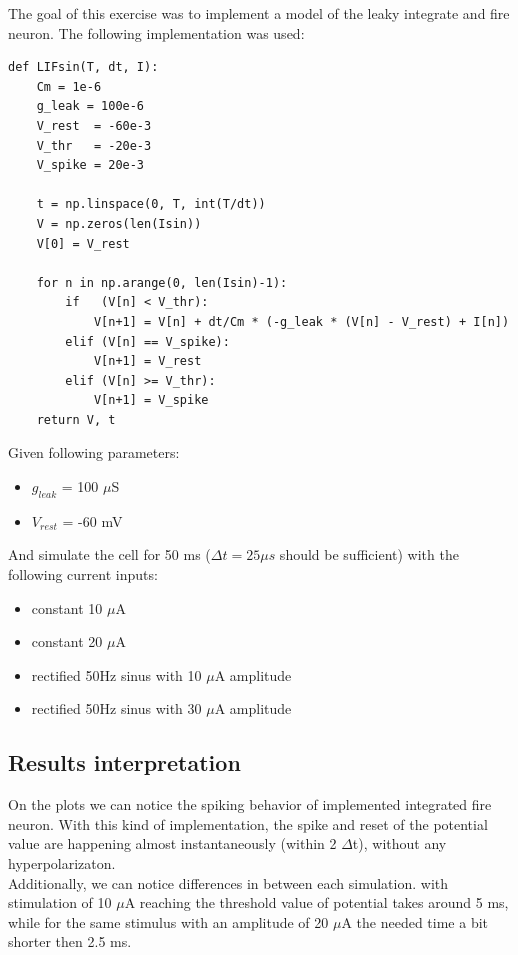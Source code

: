 \documentclass{scrartcl}			%
\begin{document}
The goal of this exercise was to implement a model of the leaky integrate and fire neuron. The following implementation was used:

\begin{Verbatim}[tabsize=4]
def LIFsin(T, dt, I):
	Cm = 1e-6
	g_leak = 100e-6
	V_rest  = -60e-3
	V_thr   = -20e-3
	V_spike = 20e-3

	t = np.linspace(0, T, int(T/dt))
	V = np.zeros(len(Isin))
	V[0] = V_rest

	for n in np.arange(0, len(Isin)-1):
		if   (V[n] < V_thr):
			V[n+1] = V[n] + dt/Cm * (-g_leak * (V[n] - V_rest) + I[n])
		elif (V[n] == V_spike):
			V[n+1] = V_rest
		elif (V[n] >= V_thr):
			V[n+1] = V_spike
	return V, t
\end{Verbatim}

Given following parameters:
\begin{itemize}
	\item $g_{leak}$ = 100 $\mu$S
	\item $V_{rest}$ = -60 mV
\end{itemize}

And simulate the cell for 50 ms ($\Delta t = 25 \mu s$ should be sufficient) with the following
current inputs:
\begin{itemize}
	\item constant 10 $\mu$A
	\item constant 20 $\mu$A
	\item rectified 50Hz sinus with 10 $\mu$A amplitude
	\item rectified 50Hz sinus with 30 $\mu$A amplitude
\end{itemize}

\newpage
\subsection{Results interpretation}

On the plots we can notice the spiking behavior of implemented integrated fire neuron. With this kind of implementation, the spike and reset of the potential value are happening almost instantaneously (within 2 $\Delta$t), without any hyperpolarizaton.\\

Additionally, we can notice differences in between each simulation. with stimulation of 10 $\mu$A reaching the threshold value of potential takes around 5 ms, while for the same stimulus with an amplitude of 20 $\mu$A the needed time a bit shorter then 2.5 ms.\\
\end{document}
